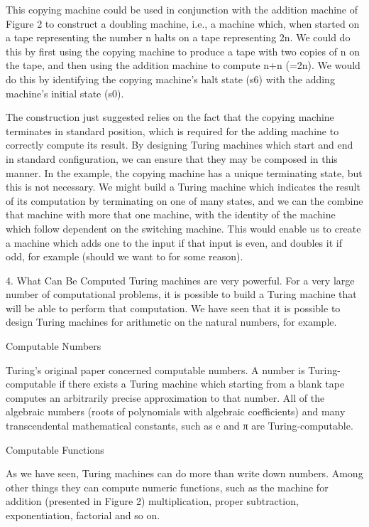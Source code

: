 This copying machine could be used in conjunction with the addition machine of Figure 2 to construct a doubling machine, i.e., a machine which, when started on a tape representing the number n halts on a tape representing 2n. We could do this by first using the copying machine to produce a tape with two copies of n on the tape, and then using the addition machine to compute n+n (=2n). We would do this by identifying the copying machine's halt state (s6) with the adding machine's initial state (s0).

The construction just suggested relies on the fact that the copying machine terminates in standard position, which is required for the adding machine to correctly compute its result. By designing Turing machines which start and end in standard configuration, we can ensure that they may be composed in this manner. In the example, the copying machine has a unique terminating state, but this is not necessary. We might build a Turing machine which indicates the result of its computation by terminating on one of many states, and we can the combine that machine with more that one machine, with the identity of the machine which follow dependent on the switching machine. This would enable us to create a machine which adds one to the input if that input is even, and doubles it if odd, for example (should we want to for some reason).

4. What Can Be Computed
Turing machines are very powerful. For a very large number of computational problems, it is possible to build a Turing machine that will be able to perform that computation. We have seen that it is possible to design Turing machines for arithmetic on the natural numbers, for example.

Computable Numbers

Turing's original paper concerned computable numbers. A number is Turing-computable if there exists a Turing machine which starting from a blank tape computes an arbitrarily precise approximation to that number. All of the algebraic numbers (roots of polynomials with algebraic coefficients) and many transcendental mathematical constants, such as e and π are Turing-computable.

Computable Functions

As we have seen, Turing machines can do more than write down numbers. Among other things they can compute numeric functions, such as the machine for addition (presented in Figure 2) multiplication, proper subtraction, exponentiation, factorial and so on.

